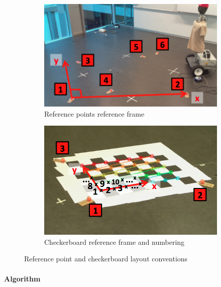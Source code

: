 \begin{figure}[htb]
	\centering
	\begin{subfigure}[b]{0.49\linewidth}
        \centering
		\includegraphics[height=0.6\linewidth]{files/ref_points.png}
		\caption{Reference points reference frame}
        \label{fig:ref_points}
	\end{subfigure}
	\begin{subfigure}[b]{0.49\linewidth}
        \centering
		\includegraphics[height=0.6\linewidth]{files/ref_checkerboard.png}
		\caption{Checkerboard reference frame and numbering}
		\label{fig:ref_checkerboard.png}
	\end{subfigure}
	\caption{Reference point and checkerboard layout conventions} 
\end{figure}

\paragraph{Algorithm}

